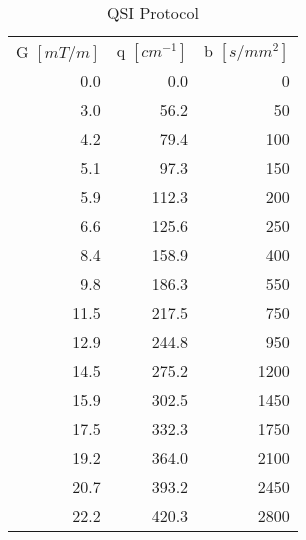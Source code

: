 \documentclass{report}
\begin{document}
  \begin{table}
      \centering
     \caption{QSI Protocol}
        \begin{tabular}{rrr}
        \addlinespace
            \multicolumn{3}{l}{\textit{set 1}}\\
        \toprule
            G $[mT/m]$ & q $[cm^{-1}]$ & b $[s/mm^2]$ \\
            \cmidrule(r){1-1}\cmidrule(lr){2-2}\cmidrule(l){3-3}
            0.0   & 0.0   & 0 \\
            3.0   & 56.2  & 50 \\
            4.2   & 79.4  & 100 \\
            5.1   & 97.3  & 150 \\
            5.9   & 112.3 & 200 \\
            6.6   & 125.6 & 250 \\
            8.4   & 158.9 & 400 \\
            9.8   & 186.3 & 550 \\
            11.5  & 217.5 & 750 \\
            12.9  & 244.8 & 950 \\
            14.5  & 275.2 & 1200 \\
            15.9  & 302.5 & 1450 \\
            17.5  & 332.3 & 1750 \\
            19.2  & 364.0 & 2100 \\
            20.7  & 393.2 & 2450 \\
            22.2  & 420.3 & 2800 \\
        \bottomrule
        \end{tabular}%
     \label{tab:chapter5 exp1 QSI protocol}
\end{table}
\end{document}
